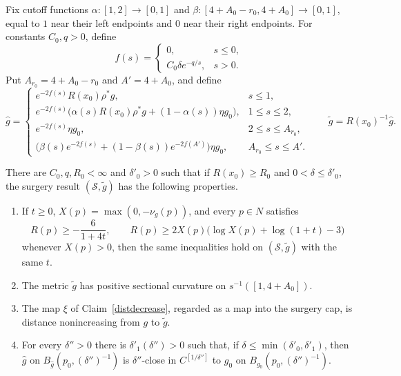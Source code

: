 Fix cutoff functions $\alpha:[1,2]\to[0,1]$ and
$\beta:[4+A_0-r_0,4+A_0]\to[0,1]$, equal to $1$ near their left endpoints
and $0$ near their right endpoints. For constants $C_0,q>0$, define
\[
  f(s)=
  \begin{cases}
  0,&s\leq0,\\
  C_0\delta e^{-q/s},&s>0.
  \end{cases}
\]
Put $A_{r_0}=4+A_0-r_0$ and $A'=4+A_0$, and define
\[
\widehat g=
\begin{cases}
e^{-2f(s)}R(x_0)\rho^*g,&s\leq1,\\
e^{-2f(s)}\bigl(\alpha(s)R(x_0)\rho^*g+(1-\alpha(s))\eta g_0\bigr),
  &1\leq s\leq2,\\
e^{-2f(s)}\eta g_0,&2\leq s\leq A_{r_0},\\
\bigl(\beta(s)e^{-2f(s)}+(1-\beta(s))e^{-2f(A')}\bigr)\eta g_0,
  &A_{r_0}\leq s\leq A'.
\end{cases}
\qquad
\widetilde g=R(x_0)^{-1}\widehat g.
\]

\begin{theorem}
\label{thm:local-surgery}
\label{LOCALSURGERY}
There are $C_0,q,R_0<\infty$ and $\delta'_0>0$ such that if
$R(x_0)\geq R_0$ and $0<\delta\leq\delta'_0$, the surgery result
$({\mathcal S},\widetilde g)$ has the following properties.
\begin{enumerate}
\item If $t\geq0$, $X(p)=\max(0,-\nu_g(p))$, and every $p\in N$ satisfies
\[
  R(p)\geq-\frac6{1+4t},
  \qquad
  R(p)\geq2X(p)\bigl(\log X(p)+\log(1+t)-3\bigr)
\]
whenever $X(p)>0$, then the same inequalities hold on
$({\mathcal S},\widetilde g)$ with the same $t$.
\item The metric $\widetilde g$ has positive sectional curvature on
$s^{-1}([1,4+A_0])$.
\item The map $\xi$ of Claim~\ref{distdecrease}, regarded as a map into the
surgery cap, is distance nonincreasing from $g$ to $\widetilde g$.
\item For every $\delta''>0$ there is
$\delta'_1(\delta'')>0$ such that, if
$\delta\leq\min(\delta'_0,\delta'_1)$, then
$\widehat g$ on $B_{\widehat g}(p_0,(\delta'')^{-1})$ is
$\delta''$-close in $C^{[1/\delta'']}$ to $g_0$ on
$B_{g_0}(p_0,(\delta'')^{-1})$.
\end{enumerate}
\end{theorem}


